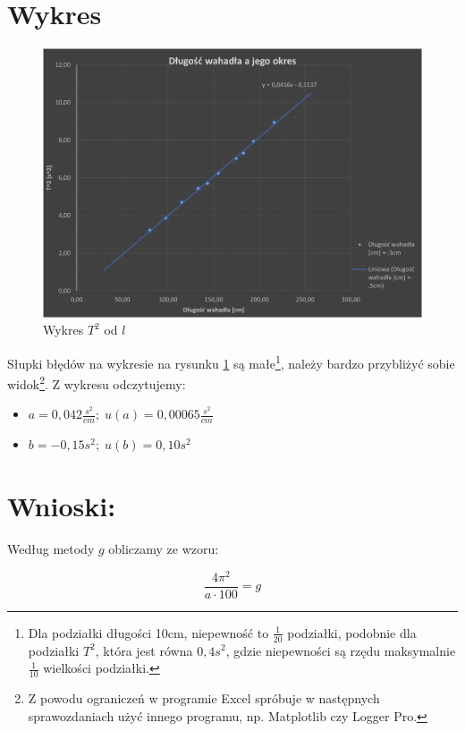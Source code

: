 \documentclass[a4paper,12pt]{article}
\begin{document}
\section{Wykres}

\begin{figure}[h]
	\centering
	\includegraphics[width=\linewidth, keepaspectratio]{Wykres.png}
	\caption{Wykres $T^2$ od $l$}\label{wykt2}
\end{figure}

Słupki błędów na wykresie na rysunku \ref{wykt2} są małe\footnote{
		Dla  podziałki długości 10cm, niepewność to $\frac{1}{20}$ podziałki, podobnie dla podziałki $T^2$, która jest równa $0,4 s^2$, gdzie niepewności są rzędu maksymalnie $\frac{1}{10}$ wielkości podziałki.
	}, należy bardzo przybliżyć sobie widok\footnote{Z powodu ograniczeń w programie Excel spróbuje w następnych sprawozdaniach użyć innego programu, np. Matplotlib czy Logger Pro.}.
Z wykresu odczytujemy:

\begin{itemize}
	\item $a = 0,042 \frac{s^2}{cm};\; u\left(a\right) = 0,00065 \frac{s^2}{cm}$
	\item $b = -0,15 s^2;\; u\left(b\right) = 0,10 s^2$
\end{itemize}

\section{Wnioski:}

Według metody $g$ obliczamy ze wzoru:

\[ \frac{4\pi^2}{a \cdot 100} = g \]
\end{document}

